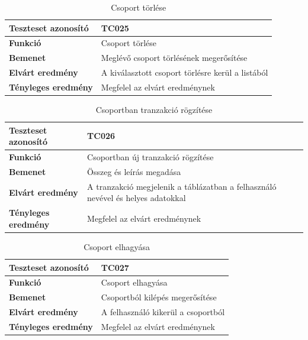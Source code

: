 \begin{table}[h!]
	\centering
	\begin{tabular}{|l|p{10cm}|}
		\hline
		\textbf{Teszteset azonosító} & TC025 \\ \hline
		\textbf{Funkció} & Csoport törlése \\ \hline
		\textbf{Bemenet} & Meglévő csoport törlésének megerősítése \\ \hline
		\textbf{Elvárt eredmény} & A kiválasztott csoport törlésre kerül a listából \\ \hline
		\textbf{Tényleges eredmény} & Megfelel az elvárt eredménynek \\ \hline
	\end{tabular}
	\caption{Csoport törlése}
	\label{tab:csoport_torles}
\end{table}

\begin{table}[h!]
	\centering
	\begin{tabular}{|l|p{10cm}|}
		\hline
		\textbf{Teszteset azonosító} & TC026 \\ \hline
		\textbf{Funkció} & Csoportban új tranzakció rögzítése \\ \hline
		\textbf{Bemenet} & Összeg és leírás megadása \\ \hline
		\textbf{Elvárt eredmény} & A tranzakció megjelenik a táblázatban a felhasználó nevével és helyes adatokkal \\ \hline
		\textbf{Tényleges eredmény} & Megfelel az elvárt eredménynek \\ \hline
	\end{tabular}
	\caption{Csoportban tranzakció rögzítése}
	\label{tab:csoport_kiadas_rogzitese}
\end{table}

\begin{table}[h!]
	\centering
	\begin{tabular}{|l|p{10cm}|}
		\hline
		\textbf{Teszteset azonosító} & TC027 \\ \hline
		\textbf{Funkció} & Csoport elhagyása \\ \hline
		\textbf{Bemenet} & Csoportból kilépés megerősítése \\ \hline
		\textbf{Elvárt eredmény} & A felhasználó kikerül a csoportból \\ \hline
		\textbf{Tényleges eredmény} & Megfelel az elvárt eredménynek \\ \hline
	\end{tabular}
	\caption{Csoport elhagyása}
	\label{tab:csoport_elhagyasa}
\end{table}

